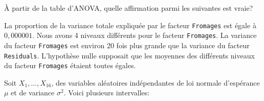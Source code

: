 \begin{questions}
À partir de la table d'ANOVA, quelle affirmation parmi les suivantes est vraie?



\begin{checkboxes}
\choice La proportion de la variance totale expliquée par le facteur \texttt{Fromages} est égale à $0,000001$. 
\choice Nous avons 4 niveaux différents pour le facteur \texttt{Fromages}.
\choice La variance du facteur \texttt{Fromages} est environ 20 fois plus grande que la variance du facteur \texttt{Residuals}.
\correctchoice L'hypothèse nulle supposait que les moyennes des différents niveaux du facteur \texttt{Fromages} étaient toutes égales.
\end{checkboxes}

\newpage

\question Soit $X_1,\hdots, X_{16}$, des variables aléatoires indépendantes de loi normale d'espérance $\mu$ et de variance $\sigma^2$. Voici plusieurs intervalles:
\begin{center}
    

\end{center}
\end{questions}
